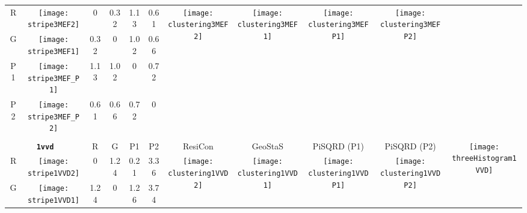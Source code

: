 \documentclass[a4paper,11pt,twoside]{book}%
\begin{document}
\begin{appendices}
\begin{sidewaystable}[h!]
\begin{tabular*}{4cm}{cc|c|c|c|c|c|c|c|c|c|}
\cline{1-10}
\multicolumn{1}{|c|}{R} & \texttt{[image: stripe3MEF2]} & 0 & 0.32 & 1.13 & 0.61 & \multirow{4}{*}{\vspace{-0.3cm}\texttt{[image: clustering3MEF2]}} & \multirow{4}{*}{\vspace{-0.3cm}\texttt{[image: clustering3MEF1]}} & \multirow{4}{*}{\vspace{-0.3cm}\texttt{[image: clustering3MEFP1]}} & \multirow{4}{*}{\vspace{-0.3cm}\texttt{[image: clustering3MEFP2]}} &  \multirow{5}{*}{} \\
\cline{1-6}
\multicolumn{1}{|c|}{G} & \texttt{[image: stripe3MEF1]} & 0.32 & 0 & 1.02 & 0.66 & \multirow{4}{*}{} & \multirow{4}{*}{} & \multirow{4}{*}{} & \multirow{4}{*}{} & \multirow{5}{*}{} \\
\cline{1-6}
\multicolumn{1}{|c|}{P1} & \texttt{[image: stripe3MEF\_P1]} & 1.13 & 1.02 & 0 & 0.72 & \multirow{4}{*}{} & \multirow{4}{*}{} & \multirow{4}{*}{} & \multirow{4}{*}{} & \multirow{5}{*}{}  \\
\cline{1-6}
\multicolumn{1}{|c|}{P2} & \texttt{[image: stripe3MEF\_P2]} & 0.61 & 0.66 & 0.72 & 0 & \multirow{4}{*}{} & \multirow{4}{*}{} & \multirow{4}{*}{} & \multirow{4}{*}{} & \multirow{5}{*}{}  \\
\cline{1-11}
\\
\cline{1-11}
\multicolumn{2}{|c|}{{\bf \texttt{1vvd}}} & R & G & P1 & P2 & ResiCon & GeoStaS & PiSQRD (P1) & PiSQRD (P2) & \multirow{5}{*}{\vspace{-0.15cm}\texttt{[image: threeHistogram1VVD]}}  \\
\cline{1-10}
\multicolumn{1}{|c|}{R} & \texttt{[image: stripe1VVD2]} & 0 & 1.24 & 0.21 & 3.36 & \multirow{4}{*}{\vspace{-0.3cm}\texttt{[image: clustering1VVD2]}} & \multirow{4}{*}{\vspace{-0.3cm}\texttt{[image: clustering1VVD1]}} & \multirow{4}{*}{\vspace{-0.3cm}\texttt{[image: clustering1VVDP1]}} & \multirow{4}{*}{\vspace{-0.3cm}\texttt{[image: clustering1VVDP2]}} &  \multirow{5}{*}{} \\
\cline{1-6}
\multicolumn{1}{|c|}{G} & \texttt{[image: stripe1VVD1]} & 1.24 & 0 & 1.26 & 3.74 & \multirow{4}{*}{} & \multirow{4}{*}{} & \multirow{4}{*}{} & \multirow{4}{*}{} & \multirow{5}{*}{} \\

\end{tabular*}
\end{sidewaystable}
\end{appendices}
\end{document}
